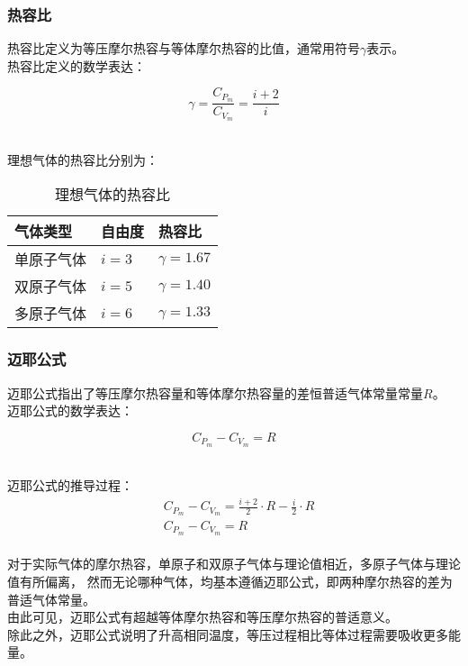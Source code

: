 \documentclass[UTF8]{ctexart}
\begin{document}
\newpage

\subsubsection{热容比}
    热容比定义为等压摩尔热容与等体摩尔热容的比值，通常用符号$\gamma$表示。\\[3mm]
    热容比定义的数学表达：
    \begin{large}
        \begin{equation*}
            \gamma=\frac{C_{P_m}}{C_{V_m}}=\frac{i+2}{i}
        \end{equation*}
    \end{large}\\
    理想气体的热容比分别为：\vspace{5pt}
    \begin{table}[h]
        \begin{center}
            \begin{tabular}{p{80pt}|p{60pt}|p{80pt}}
                \hline
                气体类型&自由度&热容比\\ \hline
                单原子气体&$i=3$&$\gamma=1.67$\\ \hline
                双原子气体&$i=5$&$\gamma=1.40$\\ \hline
                多原子气体&$i=6$&$\gamma=1.33$\\ \hline
            \end{tabular}
            \caption{理想气体的热容比}
        \end{center}
    \end{table}

\subsubsection{迈耶公式}
    迈耶公式指出了等压摩尔热容量和等体摩尔热容量的差恒普适气体常量常量$R$。\\[3mm]
    迈耶公式的数学表达：
    \begin{large}
        \begin{equation*}
            C_{P_m}-C_{V_m}=R
        \end{equation*}
    \end{large}\\
    迈耶公式的推导过程：
    \setcounter{equation}{0}
    \begin{align}
        &C_{P_m}-C_{V_m}=\frac{i+2}{2}\cdot R-\frac{i}{2}\cdot R\\[3mm]
        &C_{P_m}-C_{V_m}=R
    \end{align}\\
    对于实际气体的摩尔热容，单原子和双原子气体与理论值相近，多原子气体与理论值有所偏离，
    然而无论哪种气体，均基本遵循迈耶公式，即两种摩尔热容的差为普适气体常量。\\[3mm]
    由此可见，迈耶公式有超越等体摩尔热容和等压摩尔热容的普适意义。\\[3mm]
    除此之外，迈耶公式说明了升高相同温度，等压过程相比等体过程需要吸收更多能量。
\end{document}
